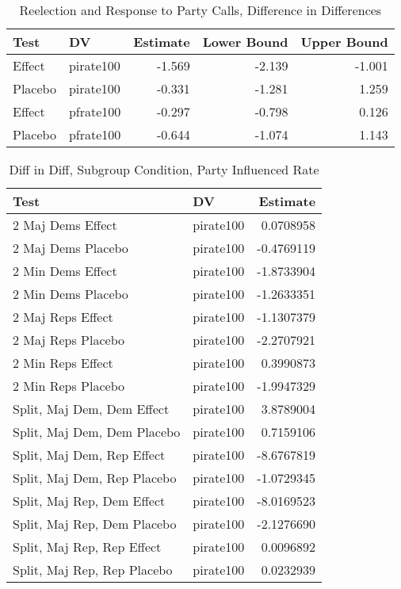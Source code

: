 \documentclass[12pt]{article}
\begin{document}
\begin{table}[H]
	\centering
	\singlespacing
	\caption{Reelection and Response to Party Calls, Difference in Differences} 
	\begin{tabular}{llrrr}
		\hline
		Test & DV & Estimate & Lower Bound & Upper Bound \\ 
		\hline
		Effect & pirate100 & -1.569 & -2.139 & -1.001 \\ 
		Placebo & pirate100 & -0.331 & -1.281 & 1.259 \\ 
		Effect & pfrate100 & -0.297 & -0.798 & 0.126 \\ 
		Placebo & pfrate100 & -0.644 & -1.074 & 1.143 \\ 
		\hline
	\end{tabular}
\end{table}

\begin{table}[H]
	\centering
	\singlespacing
	\caption{Diff in Diff, Subgroup Condition, Party Influenced Rate} 
	\begin{tabular}{llr}
		\hline
		Test & DV & Estimate \\ 
		\hline
		2 Maj Dems Effect & pirate100 & 0.0708958 \\ 
		2 Maj Dems Placebo & pirate100 & -0.4769119 \\ 
		2 Min Dems Effect & pirate100 & -1.8733904 \\ 
		2 Min Dems Placebo & pirate100 & -1.2633351 \\ 
		2 Maj Reps Effect & pirate100 & -1.1307379 \\ 
		2 Maj Reps Placebo & pirate100 & -2.2707921 \\ 
		2 Min Reps Effect & pirate100 & 0.3990873 \\ 
		2 Min Reps Placebo & pirate100 & -1.9947329 \\ 
		Split, Maj Dem, Dem Effect & pirate100 & 3.8789004 \\ 
		Split, Maj Dem, Dem Placebo & pirate100 & 0.7159106 \\ 
		Split, Maj Dem, Rep Effect & pirate100 & -8.6767819 \\ 
		Split, Maj Dem, Rep Placebo & pirate100 & -1.0729345 \\ 
		Split, Maj Rep, Dem Effect & pirate100 & -8.0169523 \\ 
		Split, Maj Rep, Dem Placebo & pirate100 & -2.1276690 \\ 
		Split, Maj Rep, Rep Effect & pirate100 & 0.0096892 \\ 
		Split, Maj Rep, Rep Placebo & pirate100 & 0.0232939 \\ 
		\hline
	\end{tabular}
\end{table}
\end{document}
